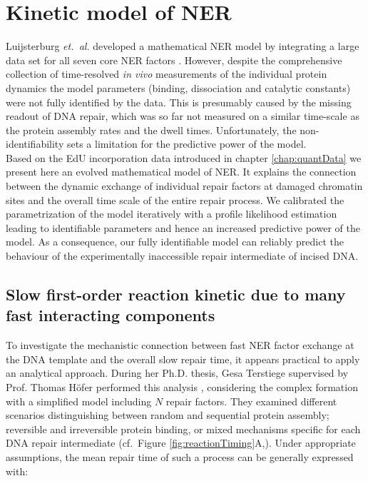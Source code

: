 \chapter{Kinetic model of NER}
\label{chap:kineticNERmodel}

Luijsterburg \textit{et.\ al.} developed a mathematical NER model by integrating a large data set for all seven core NER factors \cite{Luijsterburg2010}. However, despite the comprehensive collection of time-resolved \textit{in vivo} measurements of the individual protein dynamics the model parameters (binding, dissociation and catalytic constants) were not fully identified by the data. This is presumably caused by the missing readout of DNA repair, which was so far not measured on a similar time-scale as the protein assembly rates and the dwell times. Unfortunately, the non-identifiability sets a limitation for the predictive power of the model. \\ 
Based on the EdU incorporation data introduced in chapter \ref{chap:quantData} we present here an evolved mathematical model of NER. It explains the connection between the dynamic exchange of individual repair factors at damaged chromatin sites and the overall time scale of the entire repair process. We calibrated the parametrization of the model iteratively with a profile likelihood estimation leading to identifiable parameters and hence an increased predictive power of the model. As a consequence, our fully identifiable model can reliably predict the behaviour of the experimentally inaccessible repair intermediate of incised DNA.\\
   



\section{Slow first-order reaction kinetic due to many fast interacting components}
\label{sec:toyModel}
To investigate the mechanistic connection between fast NER factor exchange at the DNA template and the overall slow repair time, it appears practical to apply an analytical approach. During her Ph.D. thesis, Gesa Terstiege supervised by Prof. Thomas H\"ofer performed this analysis \cite{Terstiege2010,Verbruggen2014}, considering the complex formation with a simplified model including $N$ repair factors. They examined different scenarios distinguishing between random and sequential protein assembly; reversible and irreversible protein binding, or mixed mechanisms specific for each DNA repair intermediate (cf.\ Figure \ref{fig:reactionTiming}A,\cite{Verbruggen2014}). Under appropriate assumptions, the mean repair time of such a process can be generally expressed with:


